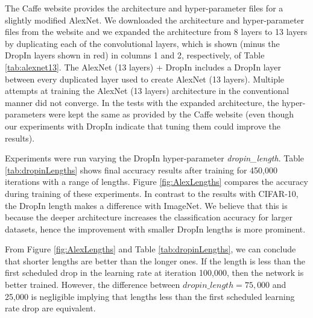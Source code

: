 \documentclass[10pt,twocolumn,letterpaper]{article}
\newcommand{\dropin}{DropIn }
\begin{document}
The Caffe website provides the architecture and hyper-parameter files for a slightly modified AlexNet. %
We downloaded the architecture and hyper-parameter files from the website and we expanded the architecture from 8 layers to 13 layers by duplicating each of the convolutional layers, which is shown (minus the \dropin layers shown in red) in columns 1 and 2, respectively, of Table \ref{tab:alexnet13}.
The AlexNet (13 layers) + \dropin includes a \dropin layer between every duplicated layer used to create AlexNet (13 layers).
Multiple attempts at training the AlexNet (13 layers) architecture in the conventional manner did not converge.
In the tests with the expanded architecture, the hyper-parameters were kept the same as provided by the Caffe website (even though our experiments with \dropin indicate that tuning them could improve the results).

Experiments were run varying the \dropin hyper-parameter \textit{dropin\_length}.
Table \ref{tab:dropinLengths} shows final accuracy results after training for 450,000 iterations with a range of lengths. 
Figure \ref{fig:AlexLengths} compares the accuracy during training of these experiments.
In contrast to the results with CIFAR-10, the \dropin length makes a difference with ImageNet.
We believe that this is because the deeper architecture increases the classification accuracy for larger datasets, hence  the improvement with smaller \dropin lengths is more prominent.

From Figure \ref{fig:AlexLengths} and Table \ref{tab:dropinLengths},  we can conclude that shorter lengths are better than the longer ones.
If the length is less than the first scheduled drop in the learning rate at iteration 100,000, then the network is better trained.
However, the difference between $dropin\_length = 75,000$ and 25,000 is negligible implying that lengths less than the first scheduled learning rate drop are equivalent.


\end{document}
